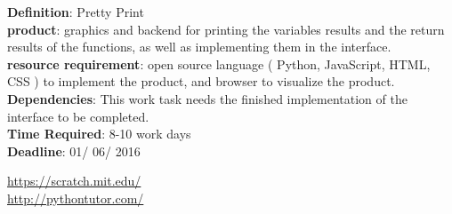 \documentclass[11pt]{article}
\begin{document}
\noindent\makebox[\linewidth]{\rule{\paperwidth}{0.4pt}}
\noindent\textbf{Definition}:  Pretty Print\\
\textbf{product}: graphics and backend for printing the variables results and the return results of the functions, as well as implementing them in the interface.\\
\textbf{resource requirement}: open source language ( Python, JavaScript, HTML, CSS ) to implement the product, and browser to visualize the product. \\
\textbf{Dependencies}: This work task needs the finished implementation of the interface to be completed.\\
\textbf{Time Required}: 8-10 work days\\
\textbf{Deadline}: 01/ 06/ 2016\\
\noindent\makebox[\linewidth]{\rule{\paperwidth}{0.4pt}}

\fi



\nocite{foutsitzis2010teaching}
\url{https://scratch.mit.edu/}\\
\url{http://pythontutor.com/}\\\\\\\\\\\\\\\\\\
\end{document}
